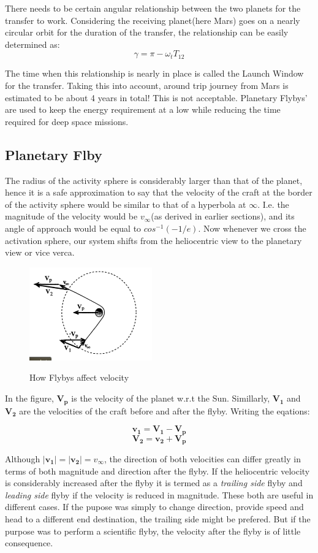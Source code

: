 \documentclass[12pt, letterpaper]{article}
\begin{document}
There needs to be certain angular relationship between the two planets for the transfer to work. Considering the receiving planet(here Mars) goes on a nearly circular orbit for the duration of the transfer, the relationship can be easily determined as:
\[
	\gamma = \pi - \omega_{t} T_{12}
\]

The time when this relationship is nearly in place is called the Launch Window for the transfer. Taking this into account, around trip journey from Mars is estimated to be about 4 years in total! This is not acceptable. Planetary Flybys' are used to keep the energy requirement at a  low while reducing the time required for deep space missions.

\subsection{Planetary Flby}

The radius of the activity sphere is considerably larger than that of the planet, hence it is a safe approximation to say that the velocity of the craft at the border of the activity sphere would be similar to that of a hyperbola at $\infty$. I.e. the magnitude of the velocity would be $v_{\infty}$(as derived in earlier sections), and its angle of approach would be equal to $cos^{-1}(-1/e)$. Now whenever we cross the activation sphere, our system shifts from the heliocentric view to the planetary view or vice verca. 

\begin{figure}[h!]
	\centering
    \includegraphics[width = 200px]{Flyby}
    \label{fig:Flyby}
    \caption{How Flybys affect velocity}
\end{figure}

In the figure, $\mathbf{V_p}$ is the velocity of the planet w.r.t the Sun. Simillarly, $\mathbf{V_1}$ and $\mathbf{V_2}$ are the velocities of the craft before and after the flyby. Writing the eqations:

\[
	\mathbf{v_1 = V_1  - V_p}
\]
\[
	\mathbf{V_2 = v_2  + V_p}
\]

Although $ |\mathbf{v_1}| = |\mathbf{v_2}|  = v_\infty$, the direction of both velocities can differ greatly in terms of both magnitude and direction after the flyby. If the heliocentric velocity is considerably increased after the flyby it is termed as a \textit{trailing side} flyby and \textit{leading side} flyby if the velocity is reduced in magnitude. These both are useful in different cases. If the pupose was simply to change direction, provide speed and head to a different end destination, the trailing side might be prefered. But if the purpose was to perform a scientific flyby, the velocity after the flyby is of little consequence.
\end{document}
